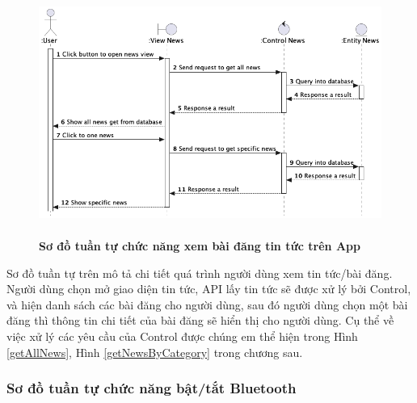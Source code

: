   \begin{figure}[H]
        \centering
        \includegraphics[width=15cm,height=8cm]{Images/mobile_app/view_news.png}
        \caption[ Sơ đồ tuần tự chức năng xem bài đăng tin tứctrên App]{\bfseries \fontsize{12pt}{0pt}
        \selectfont Sơ đồ tuần tự chức năng xem bài đăng tin tức trên App}
        \label{view_news} %
  \end{figure}

  Sơ đồ tuần tự trên mô tả chi tiết quá trình người dùng xem tin tức/bài đăng. Người dùng chọn mở giao diện tin tức, API lấy tin tức sẽ
  được xử lý bởi Control, và hiện danh sách các bài đăng cho người dùng, sau đó người dùng chọn một bài đăng thì thông tin chi tiết
  của bài đăng sẽ hiển thị cho người dùng. Cụ thể về việc xử lý các yêu cầu của Control được chúng em thể hiện trong 
  Hình \ref{getAllNews}, Hình \ref{getNewsByCategory} trong chương sau.

\subsubsection{Sơ đồ tuần tự chức năng bật/tắt Bluetooth}


